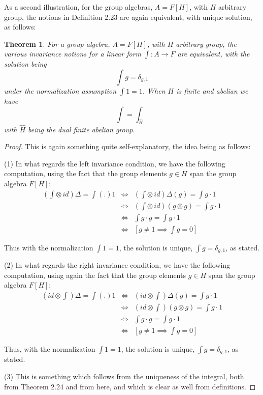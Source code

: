 \documentclass[12pt]{amsbook}
\newtheorem{theorem}{Theorem}[chapter]
\begin{document}
As a second illustration, for the group algebras, $A=F[H]$, with $H$ arbitrary group, the notions in Definition 2.23 are again equivalent, with unique solution, as follows:

\begin{theorem}
For a group algebra, $A=F[H]$, with $H$ arbitrary group, the various invariance notions for a linear form $\int:A\to F$ are equivalent, with the solution being
$$\int g=\delta_{g,1}$$
under the normalization assumption $\int 1=1$. When $H$ is finite and abelian we have
$$\int=\int_{\widehat{H}}$$
with $\widehat{H}$ being the dual finite abelian group.
\end{theorem}

\begin{proof}
This is again something quite self-explanatory, the idea being as follows:

\medskip

(1) In what regards the left invariance condition, we have the following computation, using the fact that the group elements $g\in H$ span the group algebra $F[H]$:
\begin{eqnarray*}
\left(\int\otimes\,id\right)\Delta=\int(.)1
&\iff&\left(\int\otimes\,id\right)\Delta(g)=\int g\cdot1\\
&\iff&\left(\int\otimes\,id\right)(g\otimes g)=\int g\cdot1\\
&\iff&\int g\cdot g=\int g\cdot1\\
&\iff&\left[g\neq1\implies\int g=0\right]
\end{eqnarray*}

Thus with the normalization $\int 1=1$, the solution is unique, $\int g=\delta_{g,1}$, as stated.

\medskip

(2) In what regards the right invariance condition, we have the following computation, using again the fact that the group elements $g\in H$ span the group algebra $F[H]$:
\begin{eqnarray*}
\left(id\otimes\int\right)\Delta=\int(.)1
&\iff&\left(id\otimes\int\right)\Delta(g)=\int g\cdot1\\
&\iff&\left(id\otimes\int\right)(g\otimes g)=\int g\cdot1\\
&\iff&\int g\cdot g=\int g\cdot1\\
&\iff&\left[g\neq1\implies\int g=0\right]
\end{eqnarray*}

Thus, with the normalization $\int 1=1$, the solution is unique, $\int g=\delta_{g,1}$, as stated.

\medskip

(3) This is something which follows from the uniqueness of the integral, both from Theorem 2.24 and from here, and which is clear as well from definitions.
\end{proof}
\end{document}
